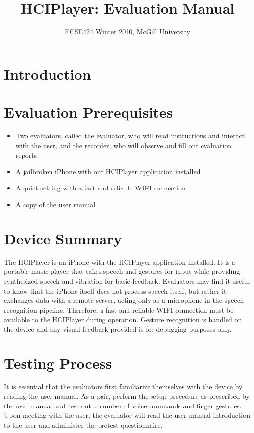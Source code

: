 \documentclass[10pt,letterpaper]{article}
\begin{document}
\title{HCIPlayer: Evaluation Manual}
\author{ECSE424 Winter 2010, McGill University}
\renewcommand{\today}{Updated: Monday, March 8th, 2010}
\maketitle

\section{Introduction}

\section{Evaluation Prerequisites}
\begin{itemize}
\item{ Two evaluators, called the evaluator, who will read instructions and interact with the user, and the recorder, who will observe and fill out evaluation reports }
\item{ A jailbroken iPhone with our HCIPlayer application installed }
\item{ A quiet setting with a fast and reliable WIFI connection }
\item{ A copy of the user manual }
\end{itemize}

\section{Device Summary}
The HCIPlayer is an iPhone with the HCIPlayer application installed. It is a portable music player that takes speech and gestures for input while providing synthesized speech and vibration for basic feedback. Evaluators may find it useful to know that the iPhone itself does not process speech itself, but rather it exchanges data with a remote server, acting only as a microphone in the speech recognition pipeline. Therefore, a fast and reliable WIFI connection must be available to the HCIPlayer during operation. Gesture recognition is handled on the device and any visual feedback provided is for debugging purposes only. 

\section{Testing Process}
It is essential that the evaluators first familiarize themselves with the device by reading the user manual. As a pair, perform the setup procedure as prescribed by the user manual and test out a number of voice commands and finger gestures. Upon meeting with the user, the evaluator will read the user manual introduction to the user and administer the pretest questionnaire.
\end{document}
